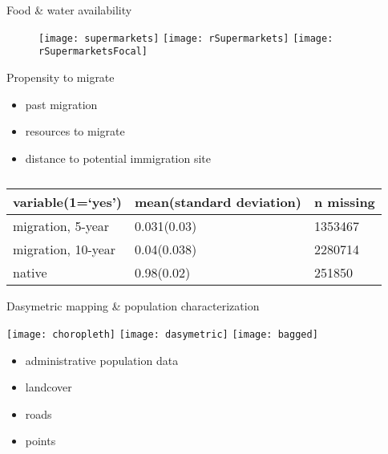 \documentclass{beamer}
\begin{document}
\begin{frame}{Food \& water availability}
  \begin{figure}
  \begin{center}
    \texttt{[image: supermarkets]}%
    \texttt{[image: rSupermarkets]}%
    \texttt{[image: rSupermarketsFocal]}
  \end{center}
  \caption{\cite{openstreetmap}}
  \end{figure}
\end{frame}


\begin{frame}{Propensity to migrate}
  \begin{itemize}
  \item past migration
  \item resources to migrate
  \item distance to potential immigration site
  \end{itemize}
  \begin{table}

  \begin{tabular}{l l l}
    \hline
    variable(1=`yes')  & mean(standard deviation) & n missing \\
    \hline
    migration, 5-year  & 0.031(0.03) & 1353467 \\
    migration, 10-year & 0.04(0.038) & 2280714 \\
    native             & 0.98(0.02) & 251850 \\
    \hline
   \end{tabular}

  \caption{\cite{ipums}}
  \end{table}

\end{frame}


\begin{frame}{Dasymetric mapping \& population characterization}
  \begin{center}
    \texttt{[image: choropleth]}%
    \texttt{[image: dasymetric]}%
    \texttt{[image: bagged]}
  \end{center}
  \begin{itemize}
  \item administrative population data
  \item landcover
  \item roads
  \item points
  \end{itemize}
\end{frame}
\end{document}
